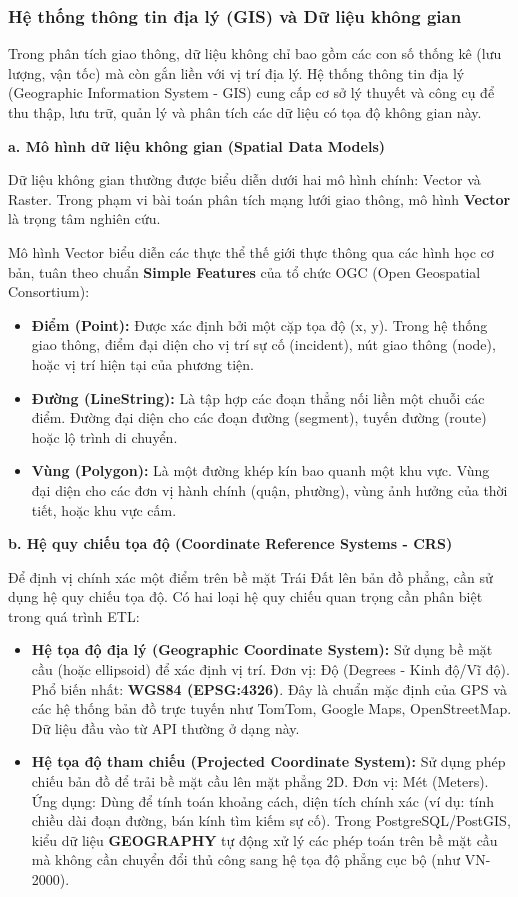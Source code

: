 \subsubsection{Hệ thống thông tin địa lý (GIS) và Dữ liệu không gian}

Trong phân tích giao thông, dữ liệu không chỉ bao gồm các con số thống kê (lưu lượng, vận tốc) mà còn gắn liền với vị trí địa lý. Hệ thống thông tin địa lý (Geographic Information System - GIS) cung cấp cơ sở lý thuyết và công cụ để thu thập, lưu trữ, quản lý và phân tích các dữ liệu có tọa độ không gian này.

\textbf{a. Mô hình dữ liệu không gian (Spatial Data Models)}

Dữ liệu không gian thường được biểu diễn dưới hai mô hình chính: Vector và Raster. Trong phạm vi bài toán phân tích mạng lưới giao thông, mô hình \textbf{Vector} là trọng tâm nghiên cứu.

Mô hình Vector biểu diễn các thực thể thế giới thực thông qua các hình học cơ bản, tuân theo chuẩn \textbf{Simple Features} của tổ chức OGC (Open Geospatial Consortium):
\begin{itemize}
    \item \textbf{Điểm (Point):} Được xác định bởi một cặp tọa độ (x, y). Trong hệ thống giao thông, điểm đại diện cho vị trí sự cố (incident), nút giao thông (node), hoặc vị trí hiện tại của phương tiện.
    \item \textbf{Đường (LineString):} Là tập hợp các đoạn thẳng nối liền một chuỗi các điểm. Đường đại diện cho các đoạn đường (segment), tuyến đường (route) hoặc lộ trình di chuyển.
    \item \textbf{Vùng (Polygon):} Là một đường khép kín bao quanh một khu vực. Vùng đại diện cho các đơn vị hành chính (quận, phường), vùng ảnh hưởng của thời tiết, hoặc khu vực cấm.
\end{itemize}

\textbf{b. Hệ quy chiếu tọa độ (Coordinate Reference Systems - CRS)}

Để định vị chính xác một điểm trên bề mặt Trái Đất lên bản đồ phẳng, cần sử dụng hệ quy chiếu tọa độ. Có hai loại hệ quy chiếu quan trọng cần phân biệt trong quá trình ETL:
\begin{itemize}
    \item \textbf{Hệ tọa độ địa lý (Geographic Coordinate System):} Sử dụng bề mặt cầu (hoặc ellipsoid) để xác định vị trí. Đơn vị: Độ (Degrees - Kinh độ/Vĩ độ). Phổ biến nhất: \textbf{WGS84 (EPSG:4326)}. Đây là chuẩn mặc định của GPS và các hệ thống bản đồ trực tuyến như TomTom, Google Maps, OpenStreetMap. Dữ liệu đầu vào từ API thường ở dạng này.
    \item \textbf{Hệ tọa độ tham chiếu (Projected Coordinate System):} Sử dụng phép chiếu bản đồ để trải bề mặt cầu lên mặt phẳng 2D. Đơn vị: Mét (Meters). Ứng dụng: Dùng để tính toán khoảng cách, diện tích chính xác (ví dụ: tính chiều dài đoạn đường, bán kính tìm kiếm sự cố). Trong PostgreSQL/PostGIS, kiểu dữ liệu \textbf{GEOGRAPHY} tự động xử lý các phép toán trên bề mặt cầu mà không cần chuyển đổi thủ công sang hệ tọa độ phẳng cục bộ (như VN-2000).
\end{itemize}

